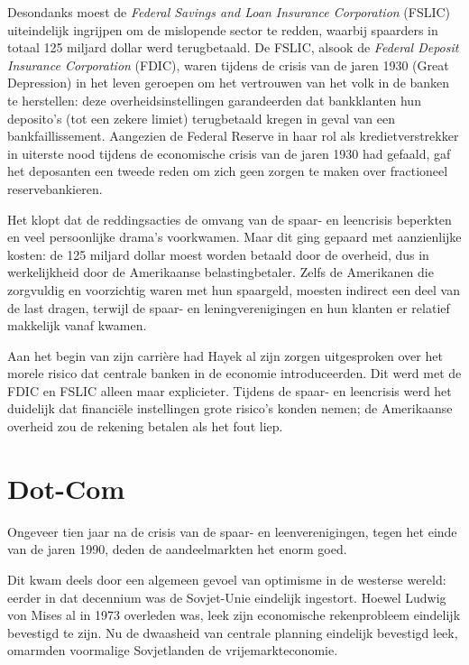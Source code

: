\documentclass[
  a5paper,
  smalldemyvopaper,11pt,twoside,onecolumn,openright,extrafontsizes,
hidelinks]{memoir}
\begin{document}
Desondanks moest de \emph{Federal Savings and Loan Insurance
Corporation} (FSLIC) uiteindelijk ingrijpen om de mislopende sector te
redden, waarbij spaarders in totaal 125 miljard dollar werd
terugbetaald. De FSLIC, alsook de \emph{Federal Deposit Insurance
Corporation} (FDIC), waren tijdens de crisis van de jaren 1930 (Great
Depression) in het leven geroepen om het vertrouwen van het volk in de
banken te herstellen: deze overheidsinstellingen garandeerden dat
bankklanten hun deposito's (tot een zekere limiet) terugbetaald kregen
in geval van een bankfaillissement. Aangezien de Federal Reserve in haar
rol als kredietverstrekker in uiterste nood tijdens de economische
crisis van de jaren 1930 had gefaald, gaf het deposanten een tweede
reden om zich geen zorgen te maken over fractioneel reservebankieren.

Het klopt dat de reddingsacties de omvang van de spaar- en leencrisis
beperkten en veel persoonlijke drama's voorkwamen. Maar dit ging gepaard
met aanzienlijke kosten: de 125 miljard dollar moest worden betaald door
de overheid, dus in werkelijkheid door de Amerikaanse belastingbetaler.
Zelfs de Amerikanen die zorgvuldig en voorzichtig waren met hun
spaargeld, moesten indirect een deel van de last dragen, terwijl de
spaar- en leningverenigingen en hun klanten er relatief makkelijk vanaf
kwamen.

Aan het begin van zijn carrière had Hayek al zijn zorgen uitgesproken
over het morele risico dat centrale banken in de economie
introduceerden. Dit werd met de FDIC en FSLIC alleen maar explicieter.
Tijdens de spaar- en leencrisis werd het duidelijk dat financiële
instellingen grote risico's konden nemen; de Amerikaanse overheid zou de
rekening betalen als het fout liep.

\section{Dot-Com}\label{dot-com}

Ongeveer tien jaar na de crisis van de spaar- en leenverenigingen, tegen
het einde van de jaren 1990, deden de aandeelmarkten het enorm goed.

Dit kwam deels door een algemeen gevoel van optimisme in de westerse
wereld: eerder in dat decennium was de Sovjet-Unie eindelijk ingestort.
Hoewel Ludwig von Mises al in 1973 overleden was, leek zijn economische
rekenprobleem eindelijk bevestigd te zijn. Nu de dwaasheid van centrale
planning eindelijk bevestigd leek, omarmden voormalige Sovjetlanden de
vrijemarkteconomie.
\end{document}
